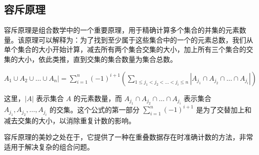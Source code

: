 

\subsection{容斥原理}

容斥原理是组合数学中的一个重要原理，用于精确计算多个集合的并集的元素数量。该原理可以解释为：为了找到至少属于这些集合中的一个的元素总数，我们从单个集合的大小开始计算，减去所有两个集合交集的大小，加上所有三个集合的交集的大小，依此类推，直到交集的集合数量为集合总数。

$
A_1 \cup A_2 \cup \ldots \cup A_n| = \sum_{i=1}^{n} (-1)^{i+1} \left( \sum_{1 \leq j_1 < j_2 < \ldots < j_i \leq n} |A_{j_1} \cap A_{j_2} \cap \ldots \cap A_{j_i}| \right)
$

这里，\( |A| \) 表示集合 \(A\) 的元素数量，而 \(A_{j_1} \cap A_{j_2} \cap \ldots \cap A_{j_i}\) 表示集合 \(A_{j_1}, A_{j_2}, \ldots, A_{j_i}\) 的交集。这个公式的第一部分 \(\sum_{i=1}^{n} (-1)^{i+1}\) 是为了交替加上和减去交集的大小，以消除重复计数的影响。

容斥原理的美妙之处在于，它提供了一种在重叠数据存在时准确计数的方法，非常适用于解决复杂的组合问题。

